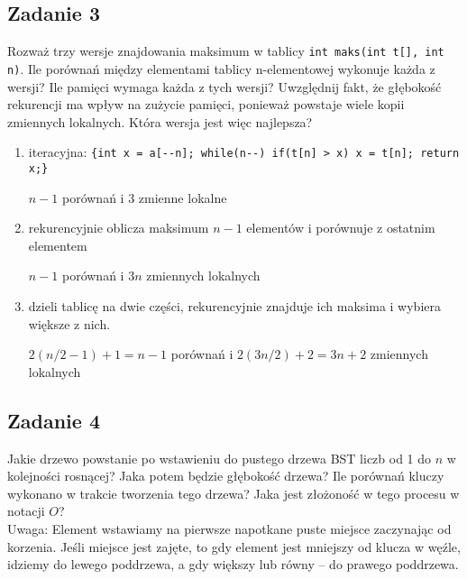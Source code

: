 \documentclass{article}
\begin{document}
\pagebreak
\subsection*{Zadanie 3}
Rozważ trzy wersje znajdowania maksimum w tablicy \verb|int maks(int t[], int n)|.
Ile porównań między elementami tablicy n-elementowej wykonuje każda z wersji? Ile
pamięci wymaga każda z tych wersji? Uwzględnij fakt, że głębokość rekurencji ma wpływ
na zużycie pamięci, ponieważ powstaje wiele kopii zmiennych lokalnych. Która wersja
jest więc najlepsza?
\begin{enumerate}[label=(\alph*)]
    \item iteracyjna: \verb|{int x = a[--n]; while(n--) if(t[n] > x) x = t[n]; return x;}|
          \begin{center}
              $n-1$ porównań i 3 zmienne lokalne
          \end{center}
    \item rekurencyjnie oblicza maksimum $n-1$ elementów i porównuje z ostatnim elementem
          \begin{center}
              $n-1$ porównań i $3n$ zmiennych lokalnych
          \end{center}
    \item dzieli tablicę na dwie części, rekurencyjnie znajduje ich maksima i wybiera większe z nich.
          \begin{center}
              $2(n/2-1)+1 = n-1$ porównań i $2(3n/2) + 2 = 3n + 2$ zmiennych lokalnych
          \end{center}
\end{enumerate}

\subsection*{Zadanie 4}
Jakie drzewo powstanie po wstawieniu do pustego drzewa BST liczb od 1 do $n$ w kolejności rosnącej?
Jaka potem będzie głębokość drzewa? Ile porównań kluczy wykonano w
trakcie tworzenia tego drzewa? Jaka jest złożoność w tego procesu w notacji $O$?
\smallskip \\
Uwaga: Element wstawiamy na pierwsze napotkane puste miejsce zaczynając od korzenia.
Jeśli miejsce jest zajęte, to gdy element jest mniejszy od klucza w węźle, idziemy
do lewego poddrzewa, a gdy większy lub równy -- do prawego poddrzewa.
\end{document}

